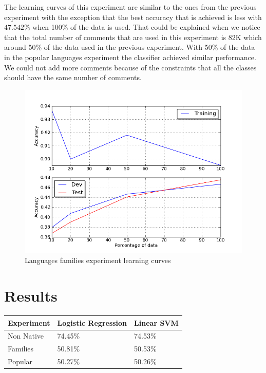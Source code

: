 \documentclass[11pt]{article}
\begin{document}
The learning curves of this experiment are similar to the ones from the previous experiment with the exception that the best accuracy that is achieved is less with $47.542\%$ when 100\% of the data is used. That could be explained when we notice that the total number of comments that are used in this experiment is 82K which around 50\% of the data used in the previous experiment. With 50\% of the data in the popular languages experiment the classifier achieved similar performance. We could not add more comments because of the constraints that all the classes should have the same number of comments.

\begin{figure}[htp]
\centering
\includegraphics[scale=0.45]{family_lc.png}
\caption{Languages families experiment learning curves}
\label{fam_lc}
\end{figure}

\section{Results}

\begin{table}[htp]
\begin{tabular}{l|ll}
	Experiment & Logistic Regression & Linear SVM
	\\\hline
	Non Native & 74.45\% & 74.53\%\\
	Families & 50.81\% &50.53\% \\
	Popular & 50.27\% & 50.26\%\\
\end{tabular}
\end{table}
\end{document}
